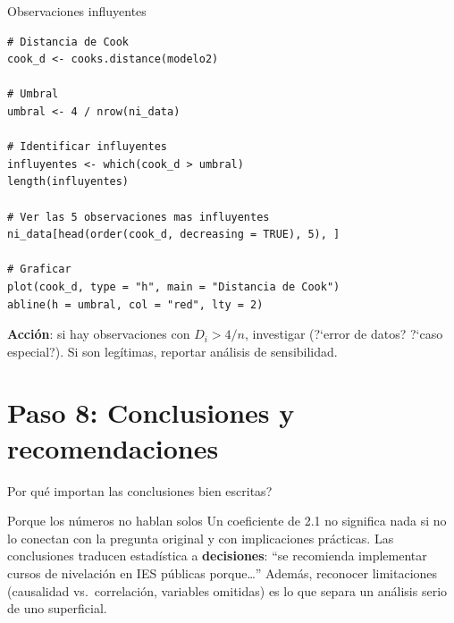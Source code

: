 \documentclass[aspectratio=169, 11pt]{beamer}
\begin{document}
\begin{frame}[fragile]{Observaciones influyentes}
\begin{lstlisting}
# Distancia de Cook
cook_d <- cooks.distance(modelo2)

# Umbral
umbral <- 4 / nrow(ni_data)

# Identificar influyentes
influyentes <- which(cook_d > umbral)
length(influyentes)

# Ver las 5 observaciones mas influyentes
ni_data[head(order(cook_d, decreasing = TRUE), 5), ]

# Graficar
plot(cook_d, type = "h", main = "Distancia de Cook")
abline(h = umbral, col = "red", lty = 2)
\end{lstlisting}

\footnotesize
\textbf{Acci\'on}: si hay observaciones con $D_i > 4/n$, investigar (?`error de datos? ?`caso especial?). Si son leg\'itimas, reportar an\'alisis de sensibilidad.
\end{frame}

\section{Paso 8: Conclusiones y recomendaciones}

\begin{frame}{\textquestiondown{}Por qu\'e importan las conclusiones bien escritas?}
\begin{exampleblock}{Porque los n\'umeros no hablan solos}
\small
Un coeficiente de 2.1 no significa nada si no lo conectan con la pregunta original y con implicaciones pr\'acticas. Las conclusiones traducen estad\'istica a \textbf{decisiones}: ``se recomienda implementar cursos de nivelaci\'on en IES p\'ublicas porque\ldots'' Adem\'as, reconocer limitaciones (causalidad vs.\ correlaci\'on, variables omitidas) es lo que separa un an\'alisis serio de uno superficial.
\end{exampleblock}
\end{frame}
\end{document}
